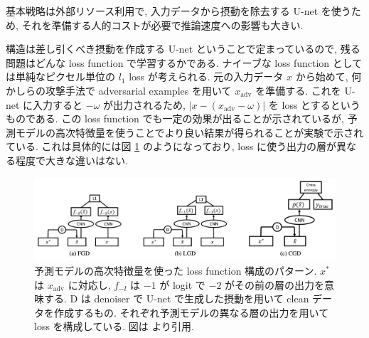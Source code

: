 基本戦略は外部リソース利用で, 入力データから摂動を除去する U-net を使うため, それを準備する人的コストが必要で推論速度への影響も大きい.

構造は差し引くべき摂動を作成する U-net ということで定まっているので, 残る問題はどんな loss function で学習するかである.
ナイーブな loss function としては単純なピクセル単位の $l_1$ loss が考えられる.
元の入力データ $x$ から始めて, 何かしらの攻撃手法で adversarial examples を用いて $x_{\text{adv}}$ を準備する.
これを U-net に入力すると $- \omega$ が出力されるため, $|x - (x_{\text{adv}} - \omega)|$ を loss とするというものである.
この loss function でも一定の効果が出ることが示されているが, 予測モデルの高次特徴量を使うことでより良い結果が得られることが実験で示されている.
これは具体的には図 \ref{fig:defense-against-three-types} のようになっており, loss に使う出力の層が異なる程度で大きな違いはない.
%
\begin{figure}[htbp]
\begin{center}
\includegraphics[width=14.0cm]{figures/defense-against-three-types.pdf}
\end{center}
\caption{
予測モデルの高次特徴量を使った loss function 構成のパターン.
$x^*$ は $x_{\text{adv}}$ に対応し, $f_{-l}$ は $-1$ が logit で $-2$ がその前の層の出力を意味する.
D は denoiser で U-net で生成した摂動を用いて clean データを作成するもの.
それぞれ予測モデルの異なる層の出力を用いて loss を構成している.
図は \cite{liao2018defense} より引用.
}
\label{fig:defense-against-three-types}
\end{figure}
%

